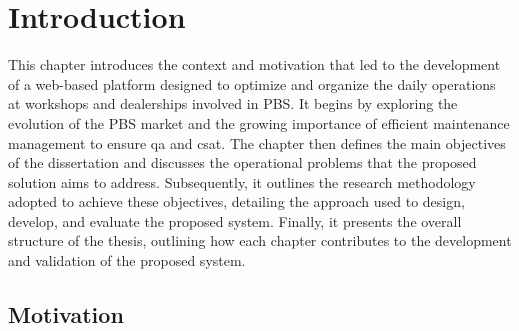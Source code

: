 \chapter{Introduction}%
\label{chapter:introduction}

\begin{introduction}


This chapter introduces the context and motivation that led to the development of a web-based platform designed to optimize and organize the daily operations at workshops and dealerships involved in \acs{PBS}. It begins by exploring the evolution of the \acs{PBS} market and the growing importance of efficient maintenance management to ensure \acs{qa} and \acs{csat}. The chapter then defines the main objectives of the dissertation and discusses the operational problems that the proposed solution aims to address. Subsequently, it outlines the research methodology adopted to achieve these objectives, detailing the approach used to design, develop, and evaluate the proposed system. Finally, it presents the overall structure of the thesis, outlining how each chapter contributes to the development and validation of the proposed system.

\end{introduction} 


\section{Motivation}

